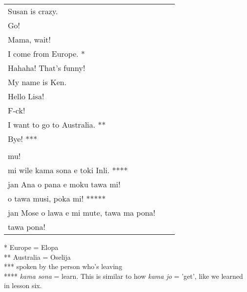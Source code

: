 \begin{supertabular}{p{5,5cm}|ll}
Susan is crazy. &&   \\ %
Go!  &&  \\ %
Mama, wait!  &&  \\ %
I come from Europe. * &&  \\ %
Hahaha! That's funny!  &&  \\ %
My name is Ken. &&  \\  %
Hello Lisa!  && \\  %
F-ck!  &&   \\ %
I want to go to Australia. **  &&  \\  %
Bye! *** &&   \\ %
 && \\ %
mu! &&   \\ %
mi wile kama sona e toki Inli. **** &&  \\ %
jan Ana o pana e moku tawa mi!  &&  \\ %
o tawa musi, poka mi! ***** &&  \\ %
jan Mose o lawa e mi mute, tawa ma pona! &&   \\ %
tawa pona!  &&   \\ %
\end{supertabular} 

* Europe = Elopa \\
** Australia = Oselija \\
*** spoken by the person who's leaving \\
****  \textit{kama sona} = learn. This is similar to how \textit{kama jo} = 'get', like we learned in lesson six. \\
